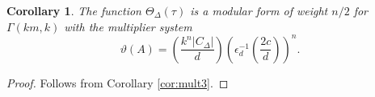 \documentclass[11pt,a4paper]{amsart}
\newtheorem{lemma}[theorem]{Lemma}
\newtheorem{corollary}[theorem]{Corollary}
\theoremstyle{definition}
\begin{document}
\begin{corollary}
	\label{cor:thetazetamult} 
	The function $\Theta_{\Delta}(\tau)$ is a modular form of weight $n/2$ for $\Gamma(km,k)$ with the multiplier system
	\[ \vartheta(A)=\left(\frac{k^n|C_{\Delta}|}{d}\right)\left(\epsilon^{-1}_d \left(\frac{2c}{d}\right)\right)^n. \]
	
	
\end{corollary}
\begin{proof}
Follows from Corollary \ref{cor:mult3}.
\end{proof}



\end{document}
